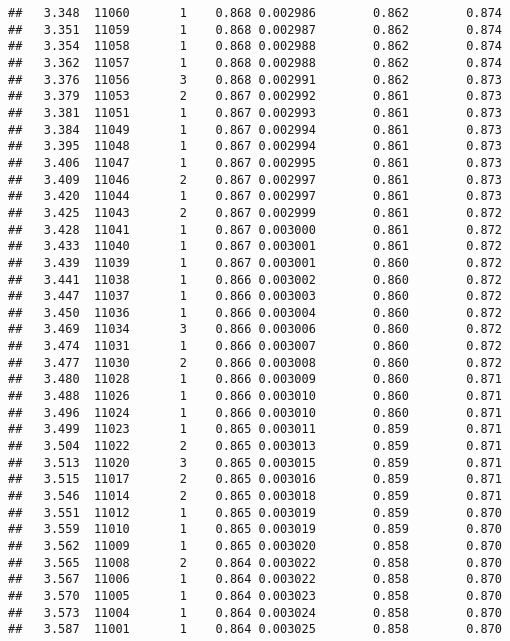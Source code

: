 \documentclass[
]{book}
\begin{document}
\begin{verbatim}
##   3.348  11060       1    0.868 0.002986        0.862        0.874
##   3.351  11059       1    0.868 0.002987        0.862        0.874
##   3.354  11058       1    0.868 0.002988        0.862        0.874
##   3.362  11057       1    0.868 0.002988        0.862        0.874
##   3.376  11056       3    0.868 0.002991        0.862        0.873
##   3.379  11053       2    0.867 0.002992        0.861        0.873
##   3.381  11051       1    0.867 0.002993        0.861        0.873
##   3.384  11049       1    0.867 0.002994        0.861        0.873
##   3.395  11048       1    0.867 0.002994        0.861        0.873
##   3.406  11047       1    0.867 0.002995        0.861        0.873
##   3.409  11046       2    0.867 0.002997        0.861        0.873
##   3.420  11044       1    0.867 0.002997        0.861        0.873
##   3.425  11043       2    0.867 0.002999        0.861        0.872
##   3.428  11041       1    0.867 0.003000        0.861        0.872
##   3.433  11040       1    0.867 0.003001        0.861        0.872
##   3.439  11039       1    0.867 0.003001        0.860        0.872
##   3.441  11038       1    0.866 0.003002        0.860        0.872
##   3.447  11037       1    0.866 0.003003        0.860        0.872
##   3.450  11036       1    0.866 0.003004        0.860        0.872
##   3.469  11034       3    0.866 0.003006        0.860        0.872
##   3.474  11031       1    0.866 0.003007        0.860        0.872
##   3.477  11030       2    0.866 0.003008        0.860        0.872
##   3.480  11028       1    0.866 0.003009        0.860        0.871
##   3.488  11026       1    0.866 0.003010        0.860        0.871
##   3.496  11024       1    0.866 0.003010        0.860        0.871
##   3.499  11023       1    0.865 0.003011        0.859        0.871
##   3.504  11022       2    0.865 0.003013        0.859        0.871
##   3.513  11020       3    0.865 0.003015        0.859        0.871
##   3.515  11017       2    0.865 0.003016        0.859        0.871
##   3.546  11014       2    0.865 0.003018        0.859        0.871
##   3.551  11012       1    0.865 0.003019        0.859        0.870
##   3.559  11010       1    0.865 0.003019        0.859        0.870
##   3.562  11009       1    0.865 0.003020        0.858        0.870
##   3.565  11008       2    0.864 0.003022        0.858        0.870
##   3.567  11006       1    0.864 0.003022        0.858        0.870
##   3.570  11005       1    0.864 0.003023        0.858        0.870
##   3.573  11004       1    0.864 0.003024        0.858        0.870
##   3.587  11001       1    0.864 0.003025        0.858        0.870

\end{verbatim}
\end{document}
